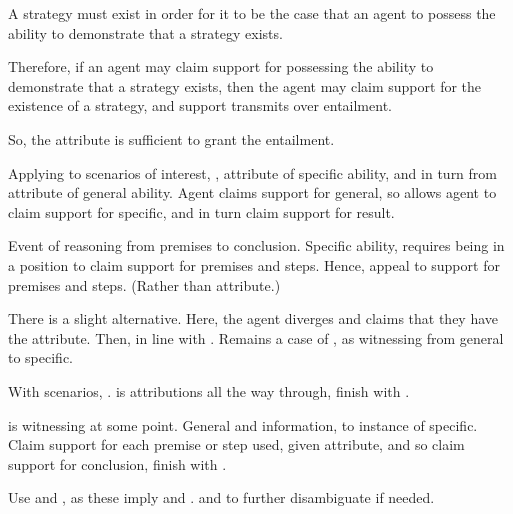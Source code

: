\begin{note}[\PA{} and \PW{}]
  \begin{proposition}[\PA{}]
    A strategy must exist in order for it to be the case that an agent to possess the ability to demonstrate that a strategy exists.

    Therefore, if an agent may claim support for possessing the ability to demonstrate that a strategy exists, then the agent may claim support for the existence of a strategy, and support transmits over entailment.

    So, the attribute is sufficient to grant the entailment.
  \end{proposition}

  Applying to scenarios of interest, \AR{}, attribute of specific ability, and in turn from attribute of general ability.
  Agent claims support for general, so allows agent to claim support for specific, and in turn claim support for result.

  \begin{proposition}[\PW{}]\label{W:s}
    Event of reasoning from premises to conclusion.
    Specific ability, requires being in a position to claim support for premises and steps.
    Hence, appeal to support for premises and steps.
    (Rather than attribute.)
  \end{proposition}

  There is a slight alternative.
  Here, the agent diverges and claims that they have the attribute.
  Then, in line with \PA{}.
  Remains a case of \WR{}, as witnessing from general to specific.
\end{note}

\begin{note}
  With scenarios, \gsi{}.
  \AR{} is attributions all the way through, finish with \PA{}.

  \WR{} is witnessing at some point.
  General and information, to instance of specific.
  Claim support for each premise or step used, given attribute, and so claim support for conclusion, finish with \PW{}.
\end{note}

\begin{note}[Terminology]
  Use \AR{} and \WR{}, as these imply \PA{} and \PW{}.
  \PA{} and \PW{} to further disambiguate if needed.
\end{note}

